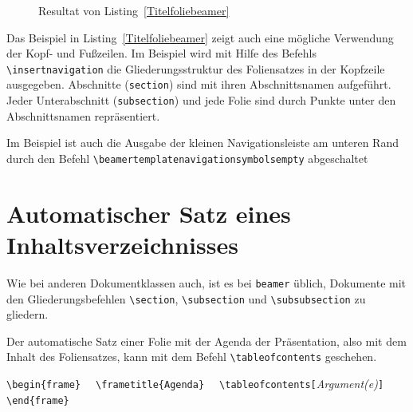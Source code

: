 \documentclass[a4paper,10pt,twoside]{scrbook}
\begin{document}
\begin{figure}[H]
	\caption{Resultat von Listing~\ref{Titelfoliebeamer}}
	\label{fig_Titelfoliebeamer}
\end{figure}

Das Beispiel in Listing~\ref{Titelfoliebeamer} zeigt auch eine mögliche Verwendung der Kopf- und Fußzeilen. Im Beispiel wird mit Hilfe des Befehls \verb!\insertnavigation! die Gliederungsstruktur des Foliensatzes in der Kopfzeile ausgegeben. Abschnitte (\verb|section|) sind mit ihren Abschnittsnamen aufgeführt. Jeder Unterabschnitt (\verb!subsection!) und jede Folie sind durch Punkte unter den Abschnittsnamen repräsentiert.  

Im Beispiel ist auch die Ausgabe der 
kleinen Navigationsleiste am unteren Rand 
durch den Befehl \verb!\beamertemplatenavigationsymbolsempty!
abgeschaltet 


\section{Automatischer Satz eines Inhaltsverzeichnisses}

Wie bei anderen Dokumentklassen auch, ist es bei \verb|beamer| üblich, Dokumente mit den Gliederungsbefehlen 
\verb|\section|,
\verb|\subsection| und
\verb|\subsubsection| zu gliedern. 

Der automatische Satz einer Folie mit der Agenda der Präsentation, also mit dem Inhalt des Foliensatzes, kann mit dem Befehl 
\verb|\tableofcontents| geschehen.

\begin{boxedminipage}{\textwidth}
	\verb!\begin{frame}!\newline
	\verb!  \frametitle{Agenda}! \newline
	\verb!	\tableofcontents[!\textsl{Argument(e)}\verb|]| \newline
	\verb!\end{frame}!
\end{boxedminipage}
\end{document}
